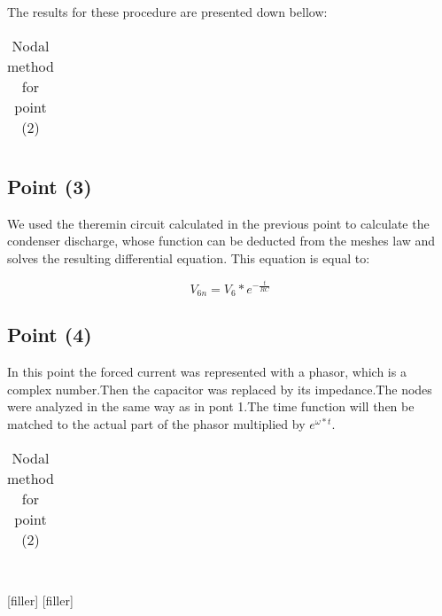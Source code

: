 The results for these procedure are presented down bellow: 

\vspace{0.2cm}
\FloatBarrier
\begin{table}[h]
  \centering
  \begin{tabular}{|c|c|c|c|c|c|c|}
    \hline    
    
    \hline
  \end{tabular}
  \caption{Nodal method for point (2)}
  \label{tab:nodal}
\end{table}
\FloatBarrier 
  

\subsection{Point (3)} 

We used the theremin circuit calculated in the previous point to calculate the condenser discharge, whose function can be deducted from the meshes law and solves the resulting differential equation. This equation is equal to:  

\begin{equation}
  V_{6n}= V_6*e^{-\frac{t}{RC}}
  \label{eq:kvl}
\end{equation}  


\subsection{Point (4)} 

In this point the forced current was represented with a phasor, which is a complex number.Then the capacitor was replaced by its impedance.The nodes were analyzed in the same way as in pont 1.The time function will then be matched to the actual part of the phasor multiplied by $e^{\omega*t}$. 

\vspace{0.2cm}
\FloatBarrier
\begin{table}[h]
  \centering
  \begin{tabular}{|c|c|c|c|c|c|c|}
    \hline    
    
    \hline
  \end{tabular}
  \caption{Nodal method for point (2)}
  \label{tab:nodal}
\end{table}
\FloatBarrier 


\begin{align*} 
[filler]
[filler]
\end{align*}

[filler]
[filler]

